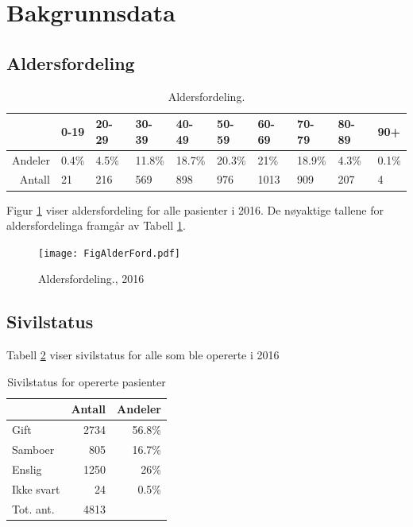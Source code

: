 \documentclass [norsk,a4paper,twoside]{article}\usepackage[]{graphicx}\usepackage[]{color}
\begin{document}
\section{Bakgrunnsdata}
\subsection{Aldersfordeling}


\begin{table}[ht]
\centering
\begin{tabular}{rlllllllll}
  \hline
 & 0-19 & 20-29 & 30-39 & 40-49 & 50-59 & 60-69 & 70-79 & 80-89 & 90+ \\ 
  \hline
Andeler & 0.4\% & 4.5\% & 11.8\% & 18.7\% & 20.3\% & 21\% & 18.9\% & 4.3\% & 0.1\% \\ 
  Antall & 21 & 216 & 569 & 898 & 976 & 1013 & 909 & 207 & 4 \\ 
   \hline
\end{tabular}
\caption{Aldersfordeling.} 
\label{tab:Alder}
\end{table}


Figur \ref{fig:Alder} viser aldersfordeling for alle pasienter i 2016.
De nøyaktige tallene for aldersfordelinga framgår av Tabell \ref{tab:Alder}. 


\begin{figure}[ht]
	\centering \texttt{[image: FigAlderFord.pdf]}
	\caption{\label{fig:Alder} Aldersfordeling., 2016}
\end{figure}


\subsection{Sivilstatus}
Tabell \ref{tab:SivStat} viser sivilstatus for alle som ble opererte i 2016

\begin{table}[ht]
\centering
\begin{tabular}{lrr}
  \hline
 & Antall & Andeler \\ 
  \hline
Gift & 2734 & 56.8\% \\ 
  Samboer & 805 & 16.7\% \\ 
  Enslig & 1250 & 26\% \\ 
  Ikke svart & 24 & 0.5\% \\ 
  Tot. ant. & 4813 &  \\ 
   \hline
\end{tabular}
\caption{Sivilstatus for opererte pasienter} 
\label{tab:SivStat}
\end{table}
\end{document}
